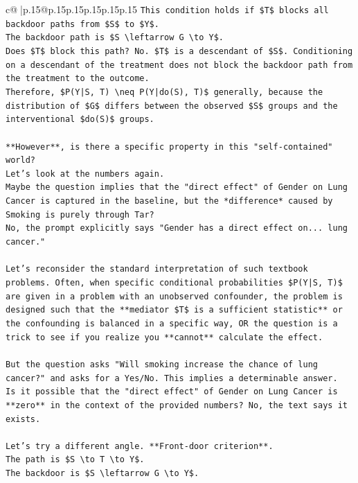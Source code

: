 \documentclass{article}
\begin{document}
{\begin{supertabular}{c@{$\;$}|p{.15\linewidth}@{}p{.15\linewidth}p{.15\linewidth}p{.15\linewidth}p{.15\linewidth}p{.15\linewidth}}
{{{\texttt{This condition holds if \$T\$ blocks all backdoor paths from \$S\$ to \$Y\$.} \\
\texttt{The backdoor path is \$S \textbackslash{}leftarrow G \textbackslash{}to Y\$.} \\
\texttt{Does \$T\$ block this path? No. \$T\$ is a descendant of \$S\$. Conditioning on a descendant of the treatment does not block the backdoor path from the treatment to the outcome.} \\
\texttt{Therefore, \$P(Y|S, T) \textbackslash{}neq P(Y|do(S), T)\$ generally, because the distribution of \$G\$ differs between the observed \$S\$ groups and the interventional \$do(S)\$ groups.} \\
\\ 
\texttt{**However**, is there a specific property in this "self{-}contained" world?} \\
\texttt{Let's look at the numbers again.} \\
\texttt{Maybe the question implies that the "direct effect" of Gender on Lung Cancer is captured in the baseline, but the *difference* caused by Smoking is purely through Tar?} \\
\texttt{No, the prompt explicitly says "Gender has a direct effect on... lung cancer."} \\
\\ 
\texttt{Let's reconsider the standard interpretation of such textbook problems. Often, when specific conditional probabilities \$P(Y|S, T)\$ are given in a problem with an unobserved confounder, the problem is designed such that the **mediator \$T\$ is a sufficient statistic** or the confounding is balanced in a specific way, OR the question is a trick to see if you realize you **cannot** calculate the effect.} \\
\\ 
\texttt{But the question asks "Will smoking increase the chance of lung cancer?" and asks for a Yes/No. This implies a determinable answer.} \\
\texttt{Is it possible that the "direct effect" of Gender on Lung Cancer is **zero** in the context of the provided numbers? No, the text says it exists.} \\
\\ 
\texttt{Let's try a different angle. **Front{-}door criterion**.} \\
\texttt{The path is \$S \textbackslash{}to T \textbackslash{}to Y\$.} \\
\texttt{The backdoor is \$S \textbackslash{}leftarrow G \textbackslash{}to Y\$.} \\
}}}
\end{supertabular}}
\end{document}
